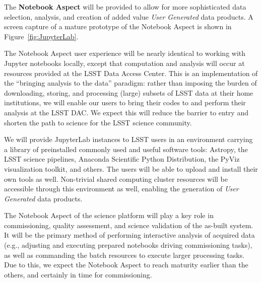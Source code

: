 The \textbf{Notebook Aspect}
will be provided to allow for more sophisticated data selection, analysis, and creation of added value \textit{User Generated} data products. 
A screen capture of a mature prototype of the Notebook Aspect is shown in Figure~\ref{fig:JupyterLab}.

The Notebook Aspect user experience will be nearly identical to working with
Jupyter notebooks locally, except that computation and analysis will occur
at resources provided at the LSST Data Access Center.
This is an
implementation of the ``bringing analysis to the data'' paradigm: rather
than imposing the burden of downloading, storing, and processing (large)
subsets of LSST data at their home institutions, we will enable our users to
bring their codes to and perform their analysis at the LSST DAC.  We expect
this will reduce the barrier to entry and shorten the path to science for
the LSST science community.

We will provide JupyterLab instances to LSST users in an environment carrying a
library of preinstalled commonly used and useful software tools:
Astropy, the LSST science pipelines, Anaconda Scientific Python Distribution, the PyViz visualization toolkit, and others. 
The users will be able to upload and install their own tools as well.
Non-trivial shared computing cluster resources will be accessible through this environment as well, enabling the generation of \textit{User Generated} data products.


The Notebook Aspect of the science platform will play a key role in commissioning,
quality assessment, and science validation of the as-built system.
It will be the primary
method of performing interactive analysis of acquired data (e.g., adjusting and executing
prepared notebooks driving commissioning tasks), as well as commanding
the batch resources to execute larger processing tasks.
Due to this, we expect the
Notebook Aspect to reach maturity earlier than the others, and certainly in time for
commissioning.


